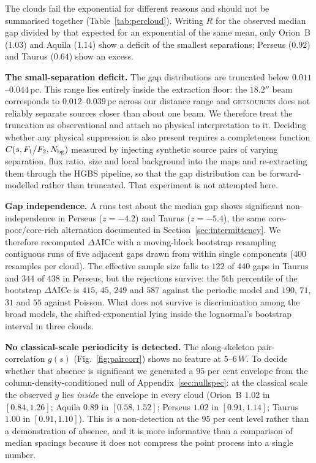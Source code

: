 \documentclass[usenatbib,twoside,twocolumn]{mnras}
\begin{document}
The clouds fail the exponential for different reasons and should not be summarised together (Table~\ref{tab:percloud}). Writing $R$ for the observed median gap divided by that expected for an exponential of the same mean, only Orion~B ($1.03$) and Aquila ($1.14$) show a deficit of the smallest separations; Perseus ($0.92$) and Taurus ($0.64$) show an excess.

\smallskip\noindent\textbf{The small-separation deficit.} The gap distributions are truncated below $0.011$--$0.044$\,pc. This range lies entirely inside the extraction floor: the $18.2''$ beam corresponds to $0.012$--$0.039$\,pc across our distance range and \textsc{getsources} does not reliably separate sources closer than about one beam. We therefore treat the truncation as observational and attach no physical interpretation to it. Deciding whether any physical suppression is also present requires a completeness function $C(s,F_1/F_2,N_{\rm bg})$ measured by injecting synthetic source pairs of varying separation, flux ratio, size and local background into the maps and re-extracting them through the HGBS pipeline, so that the gap distribution can be forward-modelled rather than truncated. That experiment is not attempted here.

\smallskip\noindent\textbf{Gap independence.} A runs test about the median gap shows significant non-independence in Perseus ($z=-4.2$) and Taurus ($z=-5.4$), the same core-poor/core-rich alternation documented in Section~\ref{sec:intermittency}. We therefore recomputed $\Delta$AICc with a moving-block bootstrap resampling contiguous runs of five adjacent gaps drawn from within single components ($400$ resamples per cloud). The effective sample size falls to $122$ of $440$ gaps in Taurus and $344$ of $438$ in Perseus, but the rejections survive: the $5$th percentile of the bootstrap $\Delta$AICc is $415$, $45$, $249$ and $587$ against the periodic model and $190$, $71$, $31$ and $55$ against Poisson. What does not survive is discrimination among the broad models, the shifted-exponential lying inside the lognormal's bootstrap interval in three clouds.

\smallskip\noindent\textbf{No classical-scale periodicity is detected.} The along-skeleton pair-correlation $g(s)$ (Fig.~\ref{fig:paircorr}) shows no feature at $5$--$6\,W$. To decide whether that absence is significant we generated a $95$ per cent envelope from the column-density-conditioned null of Appendix~\ref{sec:nullspec}: at the classical scale the observed $g$ lies \emph{inside} the envelope in every cloud (Orion~B $1.02$ in $[0.84,1.26]$; Aquila $0.89$ in $[0.58,1.52]$; Perseus $1.02$ in $[0.91,1.14]$; Taurus $1.00$ in $[0.91,1.10]$). This is a non-detection at the $95$ per cent level rather than a demonstration of absence, and it is more informative than a comparison of median spacings because it does not compress the point process into a single number.
\end{document}
